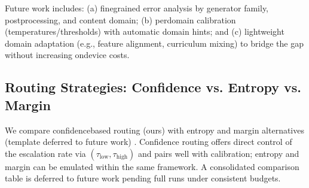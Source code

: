 Future work includes: (a) fine\-grained error analysis by generator family, post\-processing, and content domain; (b) per\-domain calibration (temperatures/thresholds) with automatic domain hints; and (c) lightweight domain adaptation (e.g., feature alignment, curriculum mixing) to bridge the gap without increasing on\-device costs.


\FloatBarrier

\subsection{Routing Strategies: Confidence vs. Entropy vs. Margin}
\label{subsec:routing_strategies}
We compare confidence\-based routing (ours) with entropy and margin alternatives (template deferred to future work) \cite{kaya2019shallowdeep}. Confidence routing offers direct control of the escalation rate via $(\tau_{\mathrm{low}},\tau_{\mathrm{high}})$ and pairs well with calibration; entropy and margin can be emulated within the same framework. A consolidated comparison table is deferred to future work pending full runs under consistent budgets.

